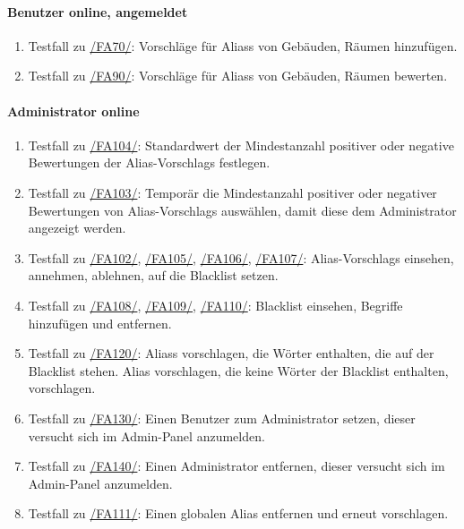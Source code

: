 \paragraph{\Gls{Benutzer} online, angemeldet}
\begin{enumerate}[label=\textbf{/T\arabic*0/}, align=left, resume]
	\item \label{/T240/} Testfall zu \hyperref[/FA70/]{/FA70/}: Vorschläge für \Glspl{Alias} von Gebäuden, Räumen hinzufügen.
	\item \label{/T250/} Testfall zu \hyperref[/FA90/]{/FA90/}: Vorschläge für \Glspl{Alias} von Gebäuden, Räumen bewerten.
\end{enumerate}

\paragraph{\Gls{Administrator} online}
\begin{enumerate}[label=\textbf{/T\arabic*0/}, align=left, resume]
	\item \label{/T260/} Testfall zu \hyperref[/FA104/]{/FA104/}: Standardwert der Mindestanzahl positiver oder negative Bewertungen der \Glspl{Alias-Vorschlag} festlegen.
	\item \label{/T270/} Testfall zu \hyperref[/FA103/]{/FA103/}: Temporär die Mindestanzahl positiver oder negativer Bewertungen von \Glspl{Alias-Vorschlag} auswählen, damit diese dem \Gls{Administrator} angezeigt werden.
	\item \label{/T280/} Testfall zu \hyperref[/FA102/]{/FA102/}, \hyperref[/FA105/]{/FA105/}, \hyperref[/FA106/]{/FA106/}, \hyperref[/FA107/]{/FA107/}: \Glspl{Alias-Vorschlag} einsehen, annehmen, ablehnen, auf die \Gls{Blacklist} setzen.
	\item \label{/T290/} Testfall zu \hyperref[/FA108/]{/FA108/}, \hyperref[/FA109/]{/FA109/}, \hyperref[/FA110/]{/FA110/}: \Gls{Blacklist} einsehen, Begriffe hinzufügen und entfernen.
	\item \label{/T291/} Testfall zu \hyperref[/FA120/]{/FA120/}: \Glspl{Alias} vorschlagen, die Wörter enthalten, die auf der \Gls{Blacklist} stehen. \Gls{Alias} vorschlagen, die keine Wörter der \Gls{Blacklist} enthalten, vorschlagen.
	\item \label{/T292/} Testfall zu \hyperref[/FA130/]{/FA130/}: Einen \Gls{Benutzer} zum \Gls{Administrator} setzen, dieser versucht sich im \Gls{Admin-Panel} anzumelden.
	\item \label{/T293/} Testfall zu \hyperref[/FA140/]{/FA140/}: Einen \Gls{Administrator} entfernen, dieser versucht sich im \Gls{Admin-Panel} anzumelden.
	\item \label{/T294/} Testfall zu \hyperref[/FA111/]{/FA111/}: Einen \gls{global}en \Gls{Alias} entfernen und erneut vorschlagen.
\end{enumerate}
